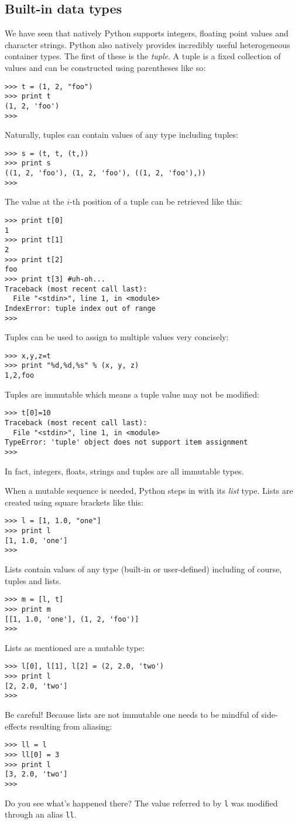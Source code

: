 \subsection{Built-in data types}

We have seen that natively Python supports integers, floating point
values and character strings. Python also natively provides incredibly
useful heterogeneous container types. The first of these is the
\emph{tuple}. A tuple is a fixed collection of values and can be
constructed using parentheses like so:
\begin{verbatim}
>>> t = (1, 2, "foo")
>>> print t
(1, 2, 'foo')
>>> \end{verbatim}
Naturally, tuples can contain values of any type including tuples:
\begin{verbatim}
>>> s = (t, t, (t,))
>>> print s
((1, 2, 'foo'), (1, 2, 'foo'), ((1, 2, 'foo'),))
>>> 
\end{verbatim}
The value at the $i$-th position of a tuple can be retrieved like this:
\begin{verbatim}
>>> print t[0]
1
>>> print t[1]
2
>>> print t[2]
foo
>>> print t[3] #uh-oh...
Traceback (most recent call last):
  File "<stdin>", line 1, in <module>
IndexError: tuple index out of range
>>> 
\end{verbatim}
Tuples can be used to assign to multiple values very concisely:
\begin{verbatim}
>>> x,y,z=t
>>> print "%d,%d,%s" % (x, y, z)
1,2,foo
\end{verbatim}
Tuples are immutable which means a tuple value may not be modified:
\begin{verbatim}
>>> t[0]=10
Traceback (most recent call last):
  File "<stdin>", line 1, in <module>
TypeError: 'tuple' object does not support item assignment
>>> 
\end{verbatim}
In fact, integers, floats, strings and tuples are all immutable types.

When a mutable sequence is needed, Python steps in with its
\emph{list} type. Lists are created using square brackets like this:
\begin{verbatim}
>>> l = [1, 1.0, "one"]
>>> print l
[1, 1.0, 'one']
>>> 
\end{verbatim}
Lists contain values of any type (built-in or user-defined) including
of course, tuples and lists.
\begin{verbatim}
>>> m = [l, t]
>>> print m
[[1, 1.0, 'one'], (1, 2, 'foo')]
>>> 
\end{verbatim}
Lists as mentioned are a mutable type:
\begin{verbatim}
>>> l[0], l[1], l[2] = (2, 2.0, 'two')
>>> print l
[2, 2.0, 'two']
>>> 
\end{verbatim}
Be careful! Because lists are not immutable one needs to be mindful of
side-effects resulting from aliasing:
\begin{verbatim}
>>> ll = l
>>> ll[0] = 3
>>> print l
[3, 2.0, 'two']
>>> 
\end{verbatim}
Do you see what's happened there? The value referred to by \verb|l|
was modified through an alias \verb|ll|. 

